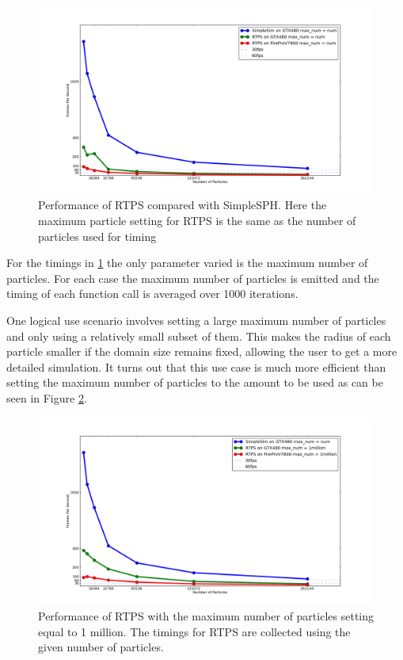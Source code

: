 \begin{figure}[!htc]
 		\centering
        \includegraphics[scale=0.45]{figures/maxnum_eq_num_fps.png}
        \caption{ {\footnotesize Performance of RTPS compared with SimpleSPH. Here the maximum
        particle setting for RTPS is the same as the number of particles used
        for timing}}
        \label{fig:fps_num}
\end{figure}

For the timings in \ref{fig:fps_num} the only parameter varied is the maximum number of particles.
For each case the maximum number of particles is emitted and the timing of each
function call is averaged over 1000 iterations.


One logical use scenario involves setting a large maximum number of
particles and only using a relatively small subset of them. This makes the
radius of each particle smaller if the domain size remains fixed, allowing the
user to get a more detailed simulation. It turns out that this use case is much
more efficient than setting the maximum number of particles to the amount to be
used as can be seen in Figure \ref{fig:fps_1mill}.


\begin{figure}[!htc]
 		\centering
        \includegraphics[scale=0.45]{figures/maxnum_eq_1mill_fps.png}
        \caption{ {\small Performance of RTPS with the maximum number of particles
        setting equal to 1 million. The timings for RTPS are collected using
        the given number of particles.}}
        \label{fig:fps_1mill}
\end{figure}

